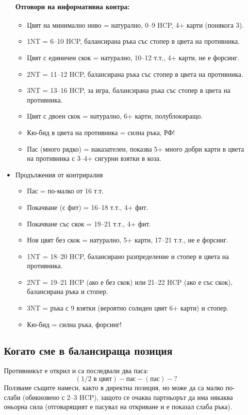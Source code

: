 \documentclass[10pt,a5paper]{extarticle}
\begin{document}
\begin{itemize}
\paragraph{Отговори на информативна контра:}
\begin{itemize}
  \item[] Цвят на минимално ниво = натурално, 0--9 HCP, 4+ карти (понякога 3).  
  \item[] 1NT = 6--10 HCP, балансирана ръка със стопер в цвета на противника.  
  \item[] Цвят с единичен скок = натурално, 10--12 т.т., 4+ карти, не е форсинг.  
  \item[] 2NT = 11--12 HCP, балансирана ръка със стопер в цвета на противника.  
  \item[] 3NT = 13--16 HCP, за игра, балансирана ръка със стопер в цвета на противника.  
  \item[] Цвят с двоен скок = натурално, 6+ карти, полублокиращо.  
  \item[] Кю-бид в цвета на противника = силна ръка, РФ!  
  \item[] Пас (много рядко) = наказателен, показва 5+ много добри карти в цвета на противника с 3--4+ сигурни взятки в коза.  
\end{itemize}
\item[]{Продължения от контриралия}
\begin{itemize}
  \item[] Пас = по-малко от 16 т.т.  
  \item[] Покачване (с фит) = 16--18 т.т., 4+ фит.  
  \item[] Покачване със скок = 19--21 т.т., 4+ фит.  
  \item[] Нов цвят без скок = натурално, 5+ карти, 17--21 т.т., не е форсинг.  
  \item[] 1NT = 18--20 HCP, балансирано разпределение и стопер в цвета на противника.  
  \item[] 2NT = 19--21 HCP (ако е без скок) или 21--22 HCP (ако е със скок), балансирана ръка и стопер.  
  \item[] 3NT = ръка с 9 взятки (вероятно солиден цвят 6+ карти) и стопер.  
  \item[] Кю-бид = силна ръка, форсинг!  
\end{itemize}
\end{itemize}

\subsection*{Когато сме в балансираща позиция}
Противникът е открил и са последвали два паса:  
\[
(1/2 \text{ в цвят}) - \text{пас} - (\text{пас}) - ?
\]
Ползваме същите намеси, както в директна позиция, но може да са малко по-слаби (обикновено с 2--3 HCP), защото се очаква партньорът да има някаква оньорна сила (отговарящият е пасувал на откриване и е показал слаба ръка).
\end{document}
